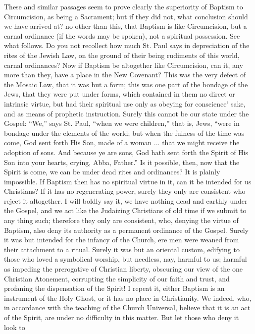 These and similar passages seem to prove clearly the superiority of
Baptism to Circumcision, as being a Sacrament; but if they did not,
what conclusion should we have arrived at? no other than this, that
Baptism is like Circumcision, but a carnal ordinance (if the words may
be spoken), not a spiritual possession. See what follows. Do you not
recollect how much St. Paul says in depreciation of the rites of the
Jewish Law, on the ground of their being rudiments of this world,
carnal ordinances? Now if Baptism be altogether like Circumcision, can
it, any more than they, have a place in the New Covenant? This was the
very defect of the Mosaic Law, that it was but a form; this was one
part of the bondage of the Jews, that they were put under forms, which
contained in them no direct or intrinsic virtue, but had their
spiritual use only as obeying for conscience' sake, and as means of
prophetic instruction. Surely this cannot be our state under the
Gospel: ``We,'' says St. Paul, ``when we were
children,'' that is, Jews, ``were in bondage under the
elements of the world; but when the fulness of the time was come, God
sent forth His Son, made of a woman ... that we might receive the
adoption of sons. And because ye are sons, God hath sent forth the
Spirit of His Son into your hearts, crying, Abba, Father.'' Is it
possible, then, now that the Spirit is come, we can be under dead
rites and ordinances? It is plainly impossible. If Baptism then has no
spiritual virtue in it, can it be intended for us Christians? If it
has no regenerating power, surely they only are consistent who reject
it altogether. I will boldly say it, we have nothing dead and earthly
under the Gospel, and we act like the Judaizing Christians of old time
if we submit to any thing such; therefore they only are consistent,
who, denying the virtue of Baptism, also deny its authority as a
permanent ordinance of the Gospel. Surely it was but intended for the
infancy of the Church, ere men were weaned from their attachment to a
ritual. Surely it was but an oriental custom, edifying to those who
loved a symbolical worship, but needless, nay, harmful to us; harmful
as impeding the prerogative of Christian liberty, obscuring our view
of the one Christian Atonement, corrupting the simplicity of our faith
and trust, and profaning the dispensation of the Spirit! I repeat it,
either Baptism is an instrument of the Holy Ghost, or it has no place
in Christianity. We indeed, who, in accordance with the teaching of
the Church Universal, believe that it is an act of the Spirit, are
under no difficulty in this matter. But let those who deny it look to
